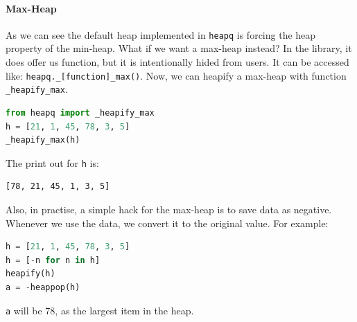 \documentclass[../main.tex]{subfiles}
\begin{document}
\paragraph{Max-Heap} As we can see the default heap implemented in  \texttt{heapq}  is forcing the heap property of the min-heap. What if we want a max-heap instead? In the library, it does offer us function, but it is intentionally hided from users. It can be accessed like: \texttt{heapq.\_[function]\_max()}. Now, we can heapify a max-heap with function \texttt{\_heapify\_max}.
\begin{lstlisting}[language = Python]
from heapq import _heapify_max
h = [21, 1, 45, 78, 3, 5]
_heapify_max(h)
\end{lstlisting}
The print out for \texttt{h} is:
\begin{lstlisting}
[78, 21, 45, 1, 3, 5]
\end{lstlisting}

Also, in practise, a simple hack for the max-heap is to save data as negative. Whenever we use the data, we convert it to the original value. For example: 
\begin{lstlisting}[language=Python]
h = [21, 1, 45, 78, 3, 5]
h = [-n for n in h]
heapify(h)
a = -heappop(h)
\end{lstlisting}
\texttt{a} will be 78, as the largest item in the heap. 
\end{document}
